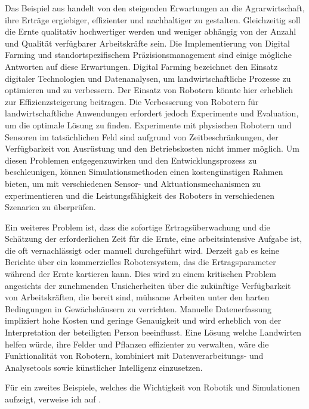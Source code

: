\documentclass[german,version-2020-11]{uzl-thesis}
\begin{document}
Das Beispiel aus \cite{Shamshiri2018} handelt von den steigenden Erwartungen an die Agrarwirtschaft, ihre Erträge ergiebiger, effizienter und nachhaltiger zu gestalten. 
Gleichzeitig soll die Ernte qualitativ hochwertiger werden und weniger abhängig von der Anzahl und Qualität verfügbarer Arbeitskräfte sein. 
Die Implementierung von Digital Farming und standortspezifischem Präzisionsmanagement sind einige mögliche Antworten auf diese Erwartungen. 
Digital Farming bezeichnet den Einsatz digitaler Technologien und Datenanalysen, um landwirtschaftliche Prozesse zu optimieren und zu verbessern. 
Der Einsatz von Robotern könnte hier erheblich zur Effizienzsteigerung beitragen.
Die Verbesserung von Robotern für landwirtschaftliche Anwendungen erfordert jedoch Experimente und Evaluation, um die optimale Lösung zu finden. 
Experimente mit physischen Robotern und Sensoren im tatsächlichen Feld sind aufgrund von Zeitbeschränkungen, der Verfügbarkeit von Ausrüstung und den Betriebskosten nicht immer möglich. 
Um diesen Problemen entgegenzuwirken und den Entwicklungsprozess zu beschleunigen, können Simulationsmethoden einen kostengünstigen Rahmen bieten, um mit verschiedenen 
Sensor- und Aktuationsmechanismen zu experimentieren und die Leistungsfähigkeit des Roboters in verschiedenen Szenarien zu überprüfen.

Ein weiteres Problem ist, dass die sofortige Ertragsüberwachung und die Schätzung der erforderlichen Zeit für die Ernte, eine arbeitsintensive Aufgabe ist, die oft vernachlässigt oder manuell durchgeführt wird. 
Derzeit gab es keine Berichte über ein kommerzielles Robotersystem, das die Ertragsparameter während der Ernte kartieren kann. 
Dies wird zu einem kritischen Problem angesichts der zunehmenden Unsicherheiten über die zukünftige Verfügbarkeit von Arbeitskräften, die bereit sind, 
mühsame Arbeiten unter den harten Bedingungen in Gewächshäusern zu verrichten. 
Manuelle Datenerfassung impliziert hohe Kosten und geringe Genauigkeit und wird erheblich von der Interpretation der beteiligten Person beeinflusst.
Eine Lösung welche Landwirten helfen würde, ihre Felder und Pflanzen effizienter zu verwalten, wäre die Funktionalität von Robotern, 
kombiniert mit Datenverarbeitungs- und Analysetools sowie künstlicher Intelligenz einzusetzen.

Für ein zweites Beispiele, welches die Wichtigkeit von Robotik und Simulationen aufzeigt, verweise ich auf \cite{Prats2012}.
\end{document}
